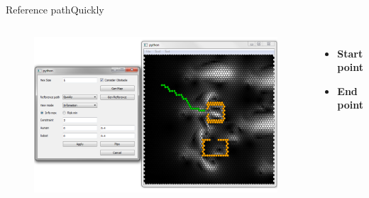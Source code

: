 \begin{frame}{Reference path}{Quickly}

\begin{columns}
\begin{figure}
\centering
\includegraphics[width = \textwidth]{./screenshot/quickly_reference_path.png}
\end{figure}

\begin{minipage}{\textwidth}
\begin{itemize}
\item \textbf{Start point}
\item \textbf{End point}
\end{itemize}
\end{minipage}
\end{columns}

\end{frame}

